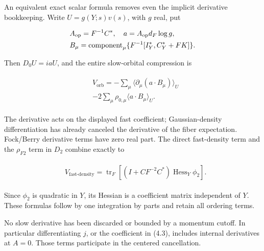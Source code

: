 An equivalent exact scalar formula removes even the implicit derivative
bookkeeping. Write \(U=g(Y;s)v(s)\), with \(g\) real, put

\begin{gather*}
\begin{aligned}
& A_{\mathrm{op}}=F^{-1} C^{*}, \quad  a=A_{\mathrm{op}} d_{F} \log  g, \\
& B_{\mu}=\operatorname{component} _{\mu}\{F^{-1}[I_{Y}^{*},C_{Y}^{*}+F K]\}.
\end{aligned}\notag
\end{gather*}

Then \(D_{0} U=i a U\), and the entire slow-orbital compression is

\begin{gather*}
\begin{aligned}
& V_{\mathrm{orb}}=-\sum _{\mu} \langle \partial _{\mu}(a \cdot  B_{\mu})\rangle _{U} \\
& -2 \sum _{\mu} \rho _{0,\mu}\langle a \cdot  B_{\mu}\rangle _{U}.
\end{aligned}\tag{4.3}
\end{gather*}

The derivative acts on the displayed fast coefficient; Gaussian-density
differentiation has already canceled the derivative of the fiber
expectation. Fock/Berry derivative terms have zero real part. The direct
fast-density term and the \(\rho _{F2}\) term in \(D_{2}\) combine
exactly to

\begin{gather*}
\begin{aligned}
& V_{\mathrm{fast\text{-}density}}=\operatorname{tr} _{F}[(I+C F^{-2} C^{*}) \operatorname{Hess} _{Y} \phi _{2}].
\end{aligned}\tag{4.4}
\end{gather*}

Since \(\phi _{2}\) is quadratic in \(Y\), its Hessian is a coefficient
matrix independent of \(Y\). These formulas follow by one integration by
parts and retain all ordering terms.

No slow derivative has been discarded or bounded by a momentum cutoff.
In particular differentiating \(j\), or the coefficient in (4.3),
includes internal derivatives at \(A=0\). Those terms participate in the
centered cancellation.

